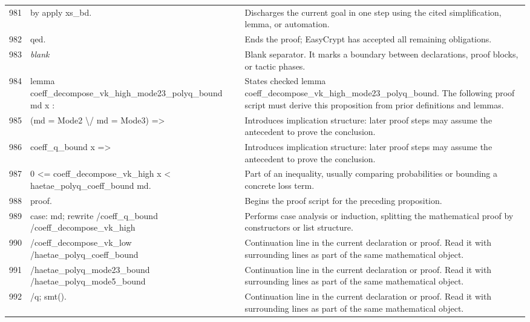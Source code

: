 \documentclass[10pt]{article}
\begin{document}
\begin{longtable}{r L{0.53\textwidth} L{0.37\textwidth}}
981 & {\ttfamily\scriptsize by apply xs\_bd.} & Discharges the current goal in one step using the cited simplification, lemma, or automation. \\
982 & {\ttfamily\scriptsize qed.} & Ends the proof; EasyCrypt has accepted all remaining obligations. \\
983 & {\ttfamily\scriptsize \emph{blank}} & Blank separator.  It marks a boundary between declarations, proof blocks, or tactic phases. \\
984 & {\ttfamily\scriptsize lemma coeff\_decompose\_vk\_high\_mode23\_polyq\_bound md x :} & States checked lemma coeff\_decompose\_vk\_high\_mode23\_polyq\_bound.  The following proof script must derive this proposition from prior definitions and lemmas. \\
985 & {\ttfamily\scriptsize   (md = Mode2 \textbackslash{}/ md = Mode3) =>} & Introduces implication structure: later proof steps may assume the antecedent to prove the conclusion. \\
986 & {\ttfamily\scriptsize   coeff\_q\_bound x =>} & Introduces implication structure: later proof steps may assume the antecedent to prove the conclusion. \\
987 & {\ttfamily\scriptsize   0 <= coeff\_decompose\_vk\_high x < haetae\_polyq\_coeff\_bound md.} & Part of an inequality, usually comparing probabilities or bounding a concrete loss term. \\
988 & {\ttfamily\scriptsize proof.} & Begins the proof script for the preceding proposition. \\
989 & {\ttfamily\scriptsize case: md; rewrite /coeff\_q\_bound /coeff\_decompose\_vk\_high} & Performs case analysis or induction, splitting the mathematical proof by constructors or list structure. \\
990 & {\ttfamily\scriptsize                   /coeff\_decompose\_vk\_low /haetae\_polyq\_coeff\_bound} & Continuation line in the current declaration or proof.  Read it with surrounding lines as part of the same mathematical object. \\
991 & {\ttfamily\scriptsize                   /haetae\_polyq\_mode23\_bound /haetae\_polyq\_mode5\_bound} & Continuation line in the current declaration or proof.  Read it with surrounding lines as part of the same mathematical object. \\
992 & {\ttfamily\scriptsize                   /q; smt().} & Continuation line in the current declaration or proof.  Read it with surrounding lines as part of the same mathematical object. \\

\end{longtable}
\end{document}
